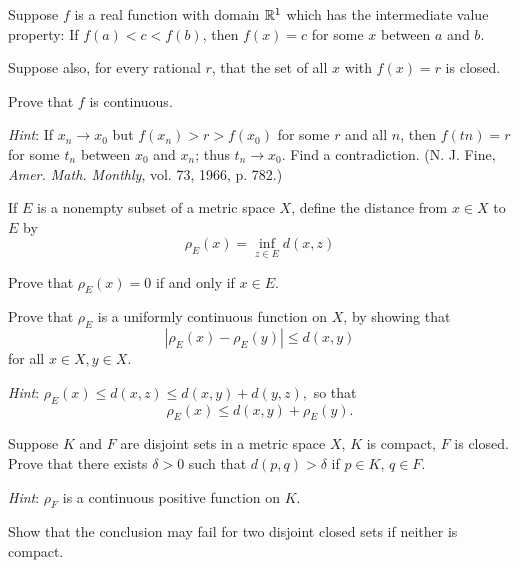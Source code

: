 \begin{myExercise}
    \label{ex:4.19}
    Suppose $f$ is a real function with domain ${\protect\mathbb R}^1$ which has the intermediate value property: 
    If $f(a)< c <f(b)$, then $f(x) = c$ for some $x$ between $a$ and $b$.
    
    Suppose also, for every rational $r$, that the set of all $x$ with $f(x) = r$ is closed. 
    
    Prove that $f$ is continuous.
    
    \emph{Hint}: If $x_n \rightarrow x_0$ but $f(x_n) > r > f(x_0)$ for some $r$ and all $n$, 
    then $f(tn) = r$ for some $t_n$ between $x_0$ and $x_n$; 
    thus $t_n \rightarrow x_0$. 
    Find a contradiction. 
    (N. J. Fine, \emph{Amer. Math. Monthly}, vol. 73, 1966, p. 782.)
\end{myExercise}


\begin{myExercise}
    \label{ex:4.20}
    If $E$ is a nonempty subset of a metric space $X$, 
    define the distance from $x \in X$ to $E$ by
    \begin{equation*}
        \rho_{E}(x)  = \inf_{z \in E} d(x,z)
    \end{equation*}
    \begin{asparaenum}[(a)]
    \item Prove that $\rho_E(x) = 0$ if and only if $x \in E$.
    \item Prove that $\rho_E$ is a uniformly continuous function on $X$, by showing that
    \begin{equation*}
        \left| \rho_E(x) - \rho_E(y) \right| \leq d(x, y)
    \end{equation*}
    for all $x \in X, y \in X$.
    \end{asparaenum}
    \emph{Hint}: $\rho_E(x) \leq d(x, z) \leq d(x, y) + d(y, z),$ 
    so that
    \begin{equation*}
        \rho_E(x) \leq d(x, y) + \rho_E(y).
    \end{equation*}
\end{myExercise}


\begin{myExercise}
    \label{ex:4.21}
    Suppose $K$ and $F$ are disjoint sets in a metric space $X$, $K$ is compact, $F$ is closed. 
    Prove that there exists $\delta > 0$ 
    such that $d(p, q) > \delta$ if $p \in K$, $q \in F$. 
    
    \emph{Hint}: $\rho_F$ is a continuous positive function on $K$.

    Show that the conclusion may fail for two disjoint closed sets if neither is compact.
\end{myExercise}


